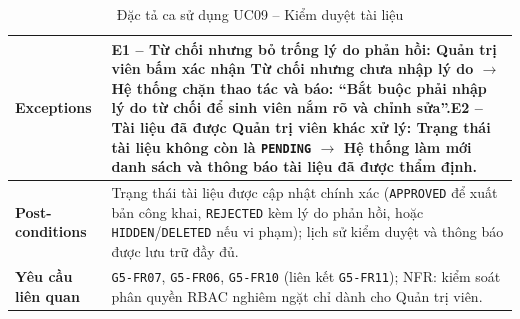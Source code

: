 \begin{table}[H]
\begin{tabularx}{\textwidth}{|p{3.5cm}|X|}
\hline
\textbf{Exceptions} & E1 -- Từ chối nhưng bỏ trống lý do phản hồi: Quản trị viên bấm xác nhận Từ chối nhưng chưa nhập lý do $\rightarrow$ Hệ thống chặn thao tác và báo: ``Bắt buộc phải nhập lý do từ chối để sinh viên nắm rõ và chỉnh sửa''.\newline E2 -- Tài liệu đã được Quản trị viên khác xử lý: Trạng thái tài liệu không còn là \texttt{PENDING} $\rightarrow$ Hệ thống làm mới danh sách và thông báo tài liệu đã được thẩm định. \\
\hline
\textbf{Post-conditions} & Trạng thái tài liệu được cập nhật chính xác (\texttt{APPROVED} để xuất bản công khai, \texttt{REJECTED} kèm lý do phản hồi, hoặc \texttt{HIDDEN}/\texttt{DELETED} nếu vi phạm); lịch sử kiểm duyệt và thông báo được lưu trữ đầy đủ. \\
\hline
\textbf{Yêu cầu liên quan} & \texttt{G5-FR07}, \texttt{G5-FR06}, \texttt{G5-FR10} (liên kết \texttt{G5-FR11}); NFR: kiểm soát phân quyền RBAC nghiêm ngặt chỉ dành cho Quản trị viên. \\
\hline
\end{tabularx}
\caption{Đặc tả ca sử dụng UC09 -- Kiểm duyệt tài liệu}
\label{tab:uc09}
\end{table}


